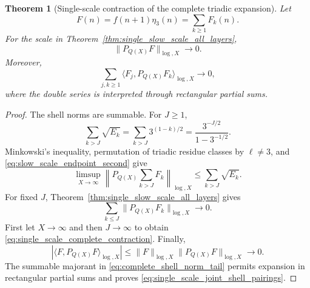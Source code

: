 \documentclass[11pt]{amsart}
\numberwithin{equation}{section}
\theoremstyle{plain}
\newtheorem{theorem}{Theorem}[section]
\theoremstyle{definition}
\theoremstyle{remark}
\begin{document}
\begin{theorem}[Single-scale contraction of the complete triadic expansion]
\label{thm:single_scale_complete_shell_contraction}
Let
\begin{equation}
F(n)=f(n+1)\eta_3(n)=\sum_{k\geq1}F_k(n).
\label{eq:complete_arithmetic_shell_function}
\end{equation}
For the scale in Theorem~\ref{thm:single_slow_scale_all_layers},
\begin{equation}
\|P_{Q(X)}F\|_{\log,X}\longrightarrow0.
\label{eq:single_scale_complete_contraction}
\end{equation}
Moreover,
\begin{equation}
\sum_{j,k\geq1}
\langle F_j,P_{Q(X)}F_k\rangle_{\log,X}
\longrightarrow0,
\label{eq:single_scale_joint_shell_pairings}
\end{equation}
where the double series is interpreted through rectangular partial sums.
\end{theorem}

\begin{proof}
The shell norms are summable.  For $J\geq1$,
\begin{equation}
\sum_{k>J}\sqrt{E_k}
=
\sum_{k>J}3^{(1-k)/2}
=
\frac{3^{-J/2}}{1-3^{-1/2}}.
\label{eq:complete_shell_norm_tail}
\end{equation}
Minkowski's inequality, permutation of triadic residue classes by $\ell\neq3$, and \eqref{eq:slow_scale_endpoint_second} give
\begin{equation}
\limsup_{X\to\infty}
\left\|
P_{Q(X)}\sum_{k>J}F_k
\right\|_{\log,X}
\leq
\sum_{k>J}\sqrt{E_k}.
\label{eq:transferred_complete_shell_tail}
\end{equation}
For fixed $J$, Theorem~\ref{thm:single_slow_scale_all_layers} gives
\begin{equation}
\sum_{k\leq J}
\|P_{Q(X)}F_k\|_{\log,X}
\longrightarrow0.
\label{eq:finite_shell_block_contraction}
\end{equation}
First let $X\to\infty$ and then $J\to\infty$ to obtain \eqref{eq:single_scale_complete_contraction}.  Finally,
\begin{equation}
\left|
\langle F,P_{Q(X)}F\rangle_{\log,X}
\right|
\leq
\|F\|_{\log,X}\|P_{Q(X)}F\|_{\log,X}
\longrightarrow0.
\label{eq:complete_single_scale_pairing_bound}
\end{equation}
The summable majorant in \eqref{eq:complete_shell_norm_tail} permits expansion in rectangular partial sums and proves \eqref{eq:single_scale_joint_shell_pairings}.
\end{proof}
\end{document}
